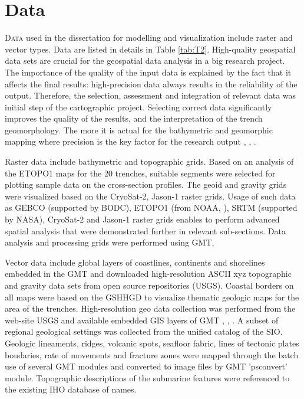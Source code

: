 \documentclass[11pt,a4paper]{report}
\begin{document}
{\section{Data}
\lettrine[lines=3]{\color{DeepPink4}D}{ata} used in the dissertation for modelling and visualization include raster and vector types. Data are listed in details in Table \ref{tab:T2}. High-quality geospatial data sets are crucial for the geospatial data analysis in a big research project. The importance of the quality of the input data is explained by the fact that it affects the final results: high-precision data always results in the reliability of the output. Therefore, the selection, assessment and integration of relevant data was initial step of the cartographic project. Selecting correct data significantly improves the quality of the results, and the interpretation of the trench geomorphology. The more it is actual for the bathymetric and geomorphic mapping where precision is the key factor for the research output \cite{Smith}, \cite{WesselWatts}, \cite{Lemenkova202009}. 

Raster data include bathymetric and topographic grids. Based on an analysis of the \ac{ETOPO1} maps for the 20 trenches, suitable segments were selected for plotting sample data on the cross-section profiles. The geoid and gravity grids were visualized based on the CryoSat-2, Jason-1 raster grids. Usage of such data as \ac{GEBCO} (supported by \ac{BODC}), \ac{ETOPO1} (from \ac{NOAA}, \cite{AmanteEakins2009}), \ac{SRTM} (supported by \ac{NASA}), CryoSat-2 and Jason-1 raster grids enables to perform advanced spatial analysis that were demonstrated further in relevant sub-sections. Data analysis and processing grids were performed using \ac{GMT}, 

Vector data include global layers of coastlines, continents and shorelines embedded in the \ac{GMT} and downloaded high-resolution \ac{ASCII} xyz topographic and gravity data sets from open source repositories (\ac{USGS}). Coastal borders on all maps were based on the \ac{GSHHGD} to visualize thematic geologic maps for the area of the trenches. High-resolution geo data collection was performed from the web-site \ac{USGS} and available embedded \ac{GIS} layers of \ac{GMT} \cite{WesselSmith1996}, \cite{WesselSmith1991}, \cite{SmithSandwell1997b}. A subset of regional geological settings was collected from the unified catalog of the \ac{SIO}. Geologic lineaments, ridges, volcanic spots, seafloor fabric, lines of tectonic plates boudaries, rate of movements and fracture zones were mapped through the batch use of several \ac{GMT} modules and converted to image files by \ac{GMT} 'psconvert' module. Topographic descriptions of the submarine features were referenced to the existing \ac{IHO} database of names. 

}
\end{document}
